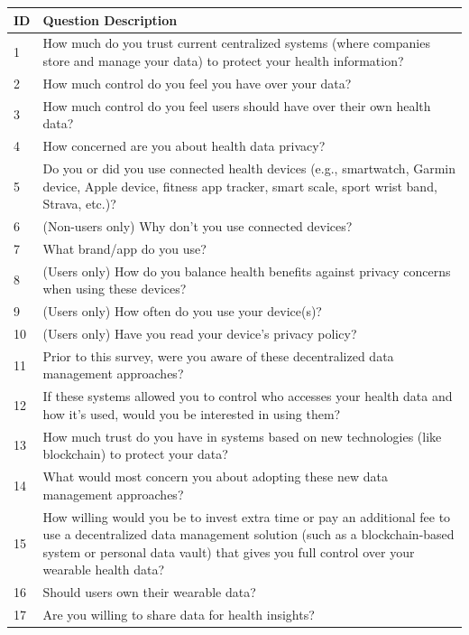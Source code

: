	\begin{table}[ht]
		\centering
		\begin{tabular}{p{1.5cm} p{13cm}}
			\toprule
			\textbf{ID} & \textbf{Question Description} \\
			\midrule
			1 & How much do you trust current centralized systems (where companies store and manage your data) to protect your health information? \\
			2 & How much control do you feel you have over your data? \\
			3 & How much control do you feel users should have over their own health data? \\
			4 & How concerned are you about health data privacy? \\
			5 & Do you or did you use connected health devices (e.g., smartwatch, Garmin device, Apple device, fitness app tracker, smart scale, sport wrist band, Strava, etc.)? \\
			6 & (Non-users only) Why don’t you use connected devices? \\
			7 & What brand/app do you use? \\
			8 & (Users only) How do you balance health benefits against privacy concerns when using these devices? \\
			9 & (Users only) How often do you use your device(s)? \\
			10 & (Users only) Have you read your device’s privacy policy? \\
			11 & Prior to this survey, were you aware of these decentralized data management approaches? \\
			12 & If these systems allowed you to control who accesses your health data and how it's used, would you be interested in using them? \\
			13 & How much trust do you have in systems based on new technologies (like blockchain) to protect your data? \\
			14 & What would most concern you about adopting these new data management approaches? \\
			15 & How willing would you be to invest extra time or pay an additional fee to use a decentralized data management solution (such as a blockchain-based system or personal data vault) that gives you full control over your wearable health data? \\
			16 & Should users own their wearable data? \\
			17 & Are you willing to share data for health insights? \\

\end{tabular}
\end{table}
